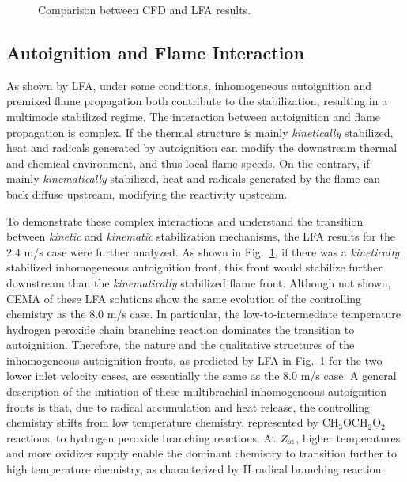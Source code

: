 \documentclass{wssci}
\begin{document}
\begin{figure}[t]
  \centering
  \scriptsize
  \resizebox{0.8\textwidth}{!}{}
  \normalsize
  \vspace{-0.2in}
  \caption{Comparison between CFD and LFA results.}
  \label{fig:LFA_V}
\end{figure}

\subsection{Autoignition and Flame Interaction}

As shown by LFA, under some conditions, inhomogeneous autoignition and premixed flame propagation both contribute to the stabilization, resulting in a multimode stabilized regime.  The interaction between autoignition and flame propagation is complex.  If the thermal structure is mainly \emph{kinetically} stabilized, heat and radicals generated by autoignition can modify the  downstream thermal and chemical environment, and thus local flame speeds.  On the contrary, if mainly \emph{kinematically} stabilized, heat and radicals generated by the flame can back diffuse upstream, modifying the reactivity upstream.  

To demonstrate these complex interactions and understand the transition between \emph{kinetic} and \emph{kinematic} stabilization mechanisms, the LFA results for the $2.4$ m/s case were further analyzed.  As shown in Fig.~\ref{fig:LFA_V}, if there was a \emph{kinetically} stabilized inhomogeneous autoignition front, this front would stabilize further downstream than the \emph{kinematically} stabilized flame front.  Although not shown, CEMA of these LFA solutions show the same evolution of the controlling chemistry as the $8.0$ m/s case.  In particular, the low-to-intermediate temperature hydrogen peroxide chain branching reaction dominates the transition to autoignition.  Therefore, the nature and the qualitative structures of the inhomogeneous autoignition fronts, as predicted by LFA in Fig.~\ref{fig:LFA_V} for the two lower inlet velocity cases, are essentially the same as the $8.0$ m/s case.  A general description of the initiation of these multibrachial inhomogeneous autoignition fronts is that, due to radical accumulation and heat release, the controlling chemistry shifts from low temperature chemistry, represented by CH$_3$OCH$_2$O$_2$ reactions, to hydrogen peroxide branching reactions.  At $Z_{\rm st}$, higher temperatures and more oxidizer supply enable the dominant chemistry to transition further to high temperature chemistry, as characterized by H radical branching reaction.   
\end{document}
